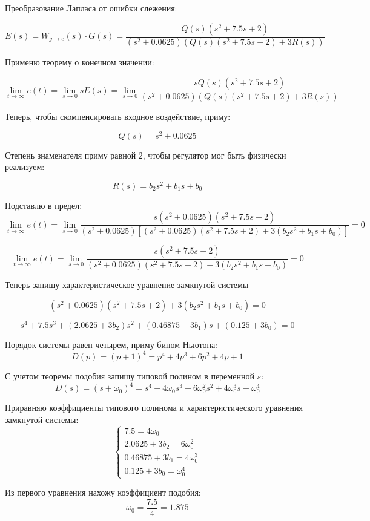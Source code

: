 \documentclass[a4paper,12pt]{article}
\begin{document}
	Преобразование Лапласа от ошибки слежения:
	
	\[E(s) = W_{g \to e}(s) \cdot G(s) = \frac{Q(s)(s^2 + 7.5s + 2)}{(s^2 + 0.0625)(Q(s)(s^2 + 7.5s + 2) + 3R(s))}\]
	
	Применю теорему о конечном значении:
	
	\[\lim_{t \to \infty} e(t) = \lim_{s \to 0} sE(s) = \lim_{s \to 0} \frac{sQ(s)(s^2 + 7.5s + 2)}{(s^2 + 0.0625)(Q(s)(s^2 + 7.5s + 2) + 3R(s))}\]

	Теперь, чтобы скомпенсировать входное воздействие, приму:
	
	\[Q(s) = s^2 + 0.0625\]
	
	Степень знаменателя приму равной \(2\), чтобы регулятор мог быть физически реализуем:
	
	\[R(s) = b_2s^2 + b_1s + b_0\]
	
	Подставлю в предел:
	\[ \lim_{t \to \infty} e(t) = \lim_{s \to 0} \frac{s(s^2 + 0.0625)(s^2 + 7.5s + 2)}{(s^2 + 0.0625)[(s^2 + 0.0625)(s^2 + 7.5s + 2) + 3(b_2s^2 + b_1s + b_0)]} = 0 \]
	
	\[ \lim_{t \to \infty} e(t) = \lim_{s \to 0} \frac{s(s^2 + 7.5s + 2)}{(s^2 + 0.0625)(s^2 + 7.5s + 2) + 3(b_2s^2 + b_1s + b_0)} = 0 \]
	
	Теперь запишу характеристическое уравнение замкнутой системы 
	
	\[ (s^2 + 0.0625)(s^2 + 7.5s + 2) + 3(b_2s^2 + b_1s + b_0) = 0\]
	
	\[ s^4 + 7.5s^3 + (2.0625 + 3b_2)s^2 + (0.46875 + 3b_1)s + (0.125 + 3b_0) = 0 \]
	
	Порядок системы равен четырем, приму бином Ньютона:
	\[
	D(p) = (p + 1)^4 = p^4 + 4p^3 + 6p^2 + 4p + 1
	\]
	
	С учетом теоремы подобия запишу типовой полином в переменной \(s\):
	\[
	D(s) = (s + \omega_0)^4 = s^4 + 4\omega_0 s^3 + 6\omega_0^2 s^2 + 4\omega_0^3 s + \omega_0^4
	\]
	
	Приравняю коэффициенты типового полинома и характеристического уравнения замкнутой системы:
	\[
	\begin{cases}
		7.5 = 4\omega_0 \\
		2.0625 + 3b_2 = 6\omega_0^2 \\
		0.46875 + 3b_1 = 4\omega_0^3 \\
		0.125 + 3b_0 = \omega_0^4
	\end{cases}
	\]
	
	Из первого уравнения нахожу коэффициент подобия:
	\[
	\omega_0 = \frac{7.5}{4} = 1.875
	\]
	
\end{document}
